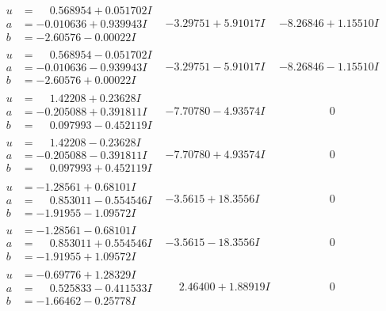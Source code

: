 \documentclass[1p]{elsarticle_modified}
\theoremstyle{definition}
\begin{document}
$$\begin{array}{c|c|c}
\begin{aligned}
u &= \phantom{-}0.568954 + 0.051702 I \\
a &= -0.010636 + 0.939943 I \\
b &= -2.60576 - 0.00022 I\end{aligned}
 & -3.29751 + 5.91017 I & -8.26846 + 1.15510 I \\ \hline\begin{aligned}
u &= \phantom{-}0.568954 - 0.051702 I \\
a &= -0.010636 - 0.939943 I \\
b &= -2.60576 + 0.00022 I\end{aligned}
 & -3.29751 - 5.91017 I & -8.26846 - 1.15510 I \\ \hline\begin{aligned}
u &= \phantom{-}1.42208 + 0.23628 I \\
a &= -0.205088 + 0.391811 I \\
b &= \phantom{-}0.097993 - 0.452119 I\end{aligned}
 & -7.70780 - 4.93574 I & \phantom{-0.000000 } 0 \\ \hline\begin{aligned}
u &= \phantom{-}1.42208 - 0.23628 I \\
a &= -0.205088 - 0.391811 I \\
b &= \phantom{-}0.097993 + 0.452119 I\end{aligned}
 & -7.70780 + 4.93574 I & \phantom{-0.000000 } 0 \\ \hline\begin{aligned}
u &= -1.28561 + 0.68101 I \\
a &= \phantom{-}0.853011 - 0.554546 I \\
b &= -1.91955 - 1.09572 I\end{aligned}
 & -3.5615 + 18.3556 I & \phantom{-0.000000 } 0 \\ \hline\begin{aligned}
u &= -1.28561 - 0.68101 I \\
a &= \phantom{-}0.853011 + 0.554546 I \\
b &= -1.91955 + 1.09572 I\end{aligned}
 & -3.5615 - 18.3556 I & \phantom{-0.000000 } 0 \\ \hline\begin{aligned}
u &= -0.69776 + 1.28329 I \\
a &= \phantom{-}0.525833 - 0.411533 I \\
b &= -1.66462 - 0.25778 I\end{aligned}
 & \phantom{-}2.46400 + 1.88919 I & \phantom{-0.000000 } 0 \\ \hline\begin{aligned}

\end{aligned}
\end{array}$$
\end{document}
